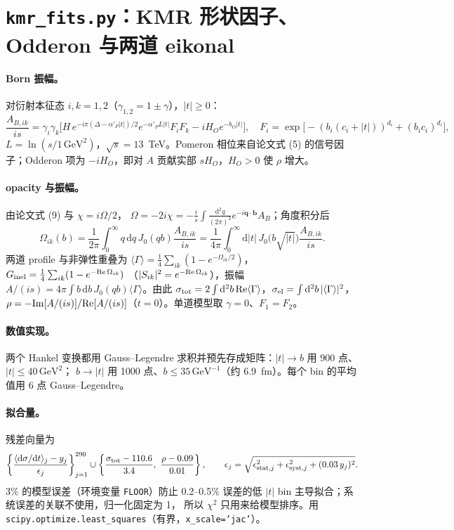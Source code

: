 \documentclass[11pt,a4paper]{ctexart}
\newcommand{\dd}{\mathrm d}
\newcommand{\GeVt}{\,\mathrm{GeV}^2}
\begin{document}
\section{\texttt{kmr\_fits.py}：KMR 形状因子、Odderon 与两道 eikonal}

\paragraph{Born 振幅。}对衍射本征态 $i,k=1,2$（$\gamma_{1,2}=1\pm\gamma$），$|t|\ge0$：
\begin{equation}
\frac{A_{B,ik}}{is}=\gamma_i\gamma_k\Big[H\,e^{-i\pi(\Delta-\alpha'_P|t|)/2}e^{-\alpha'_PL|t|}F_i F_k-iH_Oe^{-b_O|t|}\Big],\quad
F_i=\exp\!\big[-(b_i(c_i+|t|))^{d_i}+(b_ic_i)^{d_i}\big],
\end{equation}
$L=\ln(s/1\GeVt)$，$\sqrt s=13$~TeV。Pomeron 相位来自论文式 (5) 的信号因子；Odderon 项为 $-iH_O$，即对 $A$ 贡献实部
$sH_O$，$H_O>0$ 使 $\rho$ 增大。

\paragraph{opacity 与振幅。}由论文式 (9) 与 $\chi=i\Omega/2$，
$\Omega=-2i\chi=-\tfrac{i}{s}\int\frac{\dd^2q}{(2\pi)^2}e^{-i\bm q\cdot\bm b}A_B$；角度积分后
\begin{equation}
\Omega_{ik}(b)=\frac{1}{2\pi}\int_0^\infty q\,\dd q\,J_0(qb)\frac{A_{B,ik}}{is}=\frac{1}{4\pi}\int_0^\infty\dd|t|\,J_0\big(b\sqrt{|t|}\big)\frac{A_{B,ik}}{is}.
\end{equation}
两道 profile 与非弹性重叠为
$\langle\Gamma\rangle=\tfrac14\sum_{ik}(1-e^{-\Omega_{ik}/2})$，$G_{\rm inel}=\tfrac14\sum_{ik}(1-e^{-{\rm Re}\,\Omega_{ik}})$
（$|S_{ik}|^2=e^{-{\rm Re}\,\Omega_{ik}}$），振幅 $A/(is)=4\pi\int b\,\dd b\,J_0(qb)\langle\Gamma\rangle$。由此
$\sigma_{\rm tot}=2\int\dd^2b\,{\rm Re}\langle\Gamma\rangle$，$\sigma_{\rm el}=\int\dd^2b\,|\langle\Gamma\rangle|^2$，
$\rho=-{\rm Im}[A/(is)]/{\rm Re}[A/(is)]$（$t=0$）。单道模型取 $\gamma=0$、$F_1=F_2$。

\paragraph{数值实现。}两个 Hankel 变换都用 Gauss--Legendre 求积并预先存成矩阵：$|t|\to b$ 用 900 点、$|t|\le40\GeVt$；
$b\to|t|$ 用 1000 点、$b\le35\,\mathrm{GeV}^{-1}$（约 6.9~fm）。每个 bin 的平均值用 6 点 Gauss--Legendre。

\paragraph{拟合量。}残差向量为
\begin{equation}
\left\{\frac{\langle\dd\sigma/\dd t\rangle_j-y_j}{\epsilon_j}\right\}_{j=1}^{290}\cup
\left\{\frac{\sigma_{\rm tot}-110.6}{3.4},\ \frac{\rho-0.09}{0.01}\right\},\qquad
\epsilon_j=\sqrt{\epsilon_{{\rm stat},j}^2+\epsilon_{{\rm syst},j}^2+(0.03\,y_j)^2}.
\end{equation}
3\% 的模型误差（环境变量 \texttt{FLOOR}）防止 0.2--0.5\% 误差的低 $|t|$ bin 主导拟合；系统误差的关联不使用，归一化固定为 1，
所以 $\chi^2$ 只用来给模型排序。用 \texttt{scipy.optimize.least\_squares}（有界，\texttt{x\_scale='jac'}）。
\end{document}
